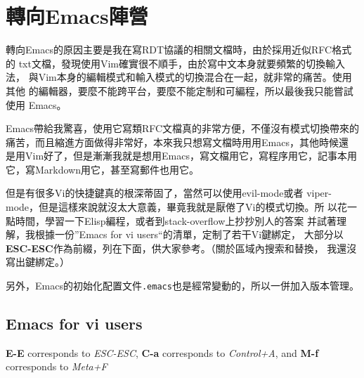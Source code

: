\part{轉向Emacs陣營}
\label{轉向emacs陣營}

轉向Emacs的原因主要是我在寫RDT協議的相關文檔時，由於採用近似RFC格式的
txt文檔，發現使用Vim確實很不順手，由於寫中文本身就要頻繁的切換輸入法，
與Vim本身的編輯模式和輸入模式的切換混合在一起，就非常的痛苦。使用其他
的編輯器，要麼不能跨平台，要麼不能定制和可編程，所以最後我只能嘗試使用
Emacs。 

Emacs帶給我驚喜，使用它寫類RFC文檔真的非常方便，不僅沒有模式切換帶來的
痛苦，而且縮進方面做得非常好，本來我只想寫文檔時用用Emacs，其他時候還
是用Vim好了，但是漸漸我就是想用Emacs，寫文檔用它，寫程序用它，記事本用
它，寫Markdown用它，甚至寫郵件也用它。

但是有很多Vi的快捷鍵真的根深蒂固了，當然可以使用evil-mode或者
viper-mode，但是這樣來說就沒太大意義，畢竟我就是厭倦了Vi的模式切換。所
以花一點時間，學習一下Elisp編程，或者到stack-overflow上抄抄別人的答案
并試著理解，我根據一份”Emacs for vi users“的清單，定制了若干Vi鍵綁定，
大部分以\textbf{ESC-ESC}作為前綴，列在下面，供大家參考。（關於區域內搜索和替換，
我還沒寫出鍵綁定。）

另外，Emacs的初始化配置文件\texttt{.emacs}也是經常變動的，所以一併加入版本管理。

\chapter{Emacs for vi users}
\label{emacsforviusers}

\textbf{E-E} corresponds to \emph{ESC-ESC}, \textbf{C-a} corresponds to \emph{Control+A}, and \textbf{M-f} corresponds to \emph{Meta+F}

